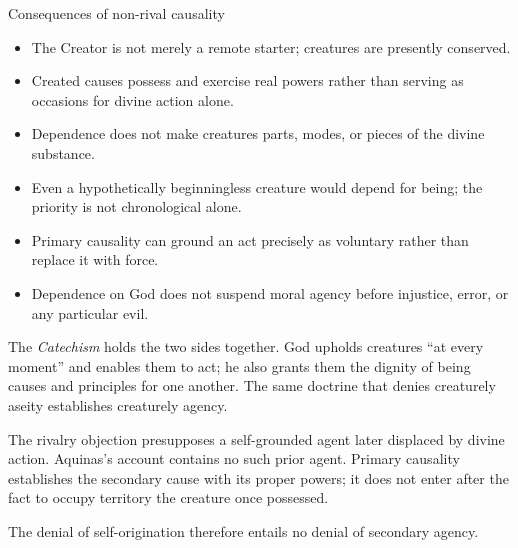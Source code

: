 \begin{studybox}{Consequences of non-rival causality}
\begin{itemize}[leftmargin=1.35em,itemsep=0.15em,topsep=0.15em]
\item The Creator is not merely a remote starter; creatures are presently conserved.
\item Created causes possess and exercise real powers rather than serving as occasions for divine action alone.
\item Dependence does not make creatures parts, modes, or pieces of the divine substance.
\item Even a hypothetically beginningless creature would depend for being; the priority is not chronological alone.
\item Primary causality can ground an act precisely as voluntary rather than replace it with force.
\item Dependence on God does not suspend moral agency before injustice, error, or any particular evil.
\end{itemize}
\end{studybox}

The \emph{Catechism} holds the two sides together. God upholds creatures ``at every moment'' and enables them to act; he also grants them the dignity of being causes and principles for one another. The same doctrine that denies creaturely aseity establishes creaturely agency.

The rivalry objection presupposes a self-grounded agent later displaced by divine action. Aquinas's account contains no such prior agent. Primary causality establishes the secondary cause with its proper powers; it does not enter after the fact to occupy territory the creature once possessed.

The denial of self-origination therefore entails no denial of secondary agency.
